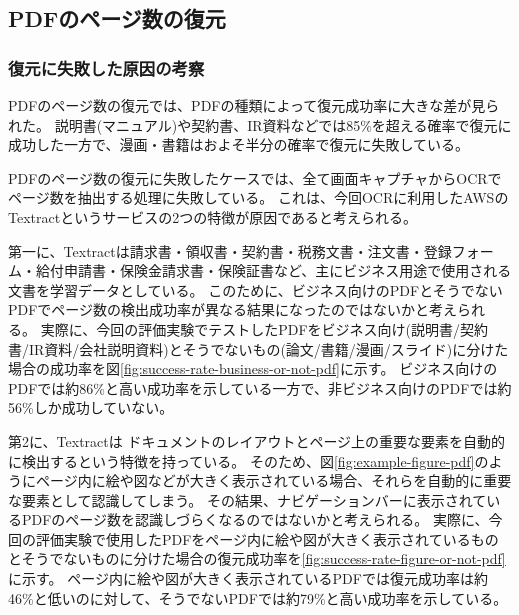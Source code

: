 
\subsection{PDFのページ数の復元}

\subsubsection{復元に失敗した原因の考察}
PDFのページ数の復元では、PDFの種類によって復元成功率に大きな差が見られた。
説明書(マニュアル)や契約書、IR資料などでは85\%を超える確率で復元に成功した一方で、漫画・書籍はおよそ半分の確率で復元に失敗している。

PDFのページ数の復元に失敗したケースでは、全て画面キャプチャからOCRでページ数を抽出する処理に失敗している。
これは、今回OCRに利用したAWSのTextractというサービスの2つの特徴が原因であると考えられる。

第一に、Textractは請求書・領収書・契約書・税務文書・注文書・登録フォーム・給付申請書・保険金請求書・保険証書など、主にビジネス用途で使用される文書を学習データとしている。
このために、ビジネス向けのPDFとそうでないPDFでページ数の検出成功率が異なる結果になったのではないかと考えられる。
実際に、今回の評価実験でテストしたPDFをビジネス向け(説明書/契約書/IR資料/会社説明資料)とそうでないもの(論文/書籍/漫画/スライド)に分けた場合の成功率を図\ref{fig:success-rate-business-or-not-pdf}に示す。
ビジネス向けのPDFでは約86\%と高い成功率を示している一方で、非ビジネス向けのPDFでは約56\%しか成功していない。

第2に、Textractは
ドキュメントのレイアウトとページ上の重要な要素を自動的に検出するという特徴を持っている。
そのため、図\ref{fig:example-figure-pdf}\cite{example-pdf}のようにページ内に絵や図などが大きく表示されている場合、それらを自動的に重要な要素として認識してしまう。
その結果、ナビゲーションバーに表示されているPDFのページ数を認識しづらくなるのではないかと考えられる。
実際に、今回の評価実験で使用したPDFをページ内に絵や図が大きく表示されているものとそうでないものに分けた場合の復元成功率を\ref{fig:success-rate-figure-or-not-pdf}に示す。
ページ内に絵や図が大きく表示されているPDFでは復元成功率は約46\%と低いのに対して、そうでないPDFでは約79\%と高い成功率を示している。

